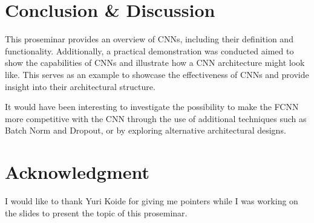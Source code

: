 \section{Conclusion \& Discussion}

This proseminar provides an overview of CNNs, including their definition and functionality.
Additionally, a practical demonstration was conducted aimed to show the capabilities of CNNs and illustrate how a CNN architecture might look like.
This serves as an example to showcase the effectiveness of CNNs and provide insight into their architectural structure.

It would have been interesting to investigate the possibility to make the FCNN more competitive with the CNN through the use of additional techniques such as Batch Norm and Dropout, or by exploring alternative architectural designs.

\section{Acknowledgment}

I would like to thank Yuri Koide for giving me pointers while I was working on the slides to present the topic of this proseminar.

